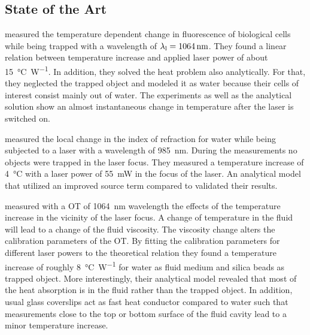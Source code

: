 \subsection{State of the Art}\label{sec:TO-state}

 measured the temperature dependent change in fluorescence of 
biological cells while being trapped with a wavelength of 
$\lal=\SI{1064}{\nm}$. They found a linear relation between temperature 
increase and applied laser power of about \SI{15}{\degreeCelsius\per\watt}. In 
addition, they solved the heat problem also analytically. For that, they 
neglected the trapped object and modeled it as water because their cells of 
interest consist mainly out of water. The experiments as well as the analytical 
solution show an almost instantaneous change in temperature after the laser is 
switched on.

 measured the local change in the index of refraction for 
water while being subjected to a laser with a wavelength of \SI{985}{\nm}. 
During the measurements no objects were trapped in the laser focus. They 
measured a temperature increase of \SI{4}{\degreeCelsius} with a laser power of 
\SI{55}{\milli\watt} in the focus of the laser. An analytical model that 
utilized an improved source term compared to \cite{Liu1995} validated their 
results.

 measured with a OT of \SI{1064}{\nm} wavelength the 
effects of the temperature increase in the vicinity of the laser focus. A 
change of temperature in the fluid will lead to a change of the fluid 
viscosity. The viscosity change alters the calibration parameters of the OT. By 
fitting the calibration parameters for different laser powers to the 
theoretical relation they found a temperature increase of roughly 
\SI{8}{\degreeCelsius\per\watt} for water as fluid medium and silica beads as 
trapped object. More interestingly, their analytical model revealed that most 
of the heat absorption is in the fluid rather than the trapped object. In 
addition, usual glass coverslips act as fast heat conductor compared to water 
such that measurements close to the top or bottom surface of the fluid cavity 
lead to a minor temperature increase.

